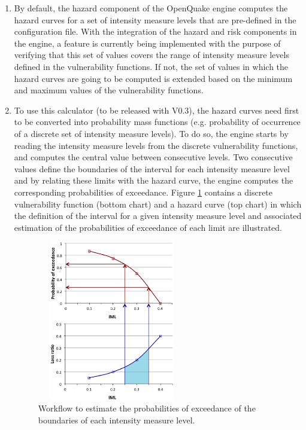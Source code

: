\begin{enumerate}
\item By default, the hazard component of the OpenQuake engine computes the hazard curves for a set of intensity measure levels that are pre-defined in the configuration file. With the integration of the hazard and risk components in the engine, a feature is currently being implemented with the purpose of verifying that this set of values covers the range of intensity measure levels defined in the vulnerability functions. If not, the set of values in which the hazard curves are going to be computed is extended based on the minimum and maximum values of the vulnerability functions.

\item To use this calculator (to be released with V0.3), the hazard curves need first to be converted into probability mass functions (e.g. probability of occurrence of a discrete set of intensity measure levels). To do so, the engine starts by reading the intensity measure levels from the discrete vulnerability functions, and computes the central value between consecutive levels. Two consecutive values define the boundaries of the interval for each intensity measure level and by relating these limits with the hazard curve, the engine computes the corresponding probabilities of exceedance. Figure \ref{fig:ProbOccurrence} contains a discrete vulnerability function (bottom chart) and a hazard curve (top chart) in which the definition of the interval for a given intensity measure level and associated estimation of the probabilities of exceedance of each limit are illustrated. 

\begin{figure}[ht]
\centering
\includegraphics[width=6.5cm,height=7cm]{./Figures/Part_Risk/ProbOccurrence.eps}
\caption{Workflow to estimate the probabilities of exceedance of the boundaries of each intensity measure level.}
\label{fig:ProbOccurrence}
\end{figure}


\end{enumerate}
